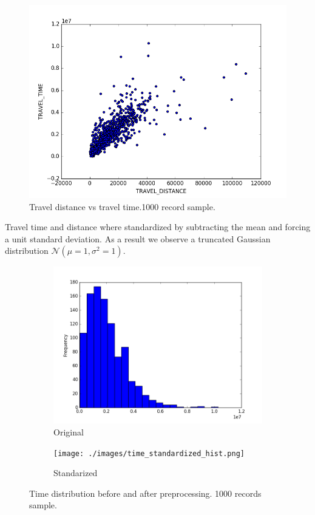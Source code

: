\documentclass{article}
\begin{document}
\begin{figure}[H]
  \centering
  \includegraphics[width=.8\linewidth]{./images/distance_vs_time.png}
  \caption{Travel distance vs travel time.1000 record sample.}
  \label{fig:preprocessing/distance_time_correlation}
\end{figure}

Travel time and distance where standardized by subtracting the mean and forcing a unit standard deviation. As a result we observe a truncated Gaussian distribution $\mathcal{N}(\mu = 1, \sigma^2 = 1)$.

\begin{figure}[H]
  \centering
  \begin{subfigure}[b]{.45\textwidth}
  	\centering
  	\includegraphics[width=\linewidth]{./images/time_hist.png}
  	\caption{Original}
  \end{subfigure}
  \begin{subfigure}[b]{.45\textwidth}
  	\centering
  	\texttt{[image: ./images/time\_standardized\_hist.png]}
  	\caption{Standarized}
  \end{subfigure}
  \caption{Time distribution before and after preprocessing. 1000 records sample.}
  	\label{fig:preprocessing/time}
\end{figure}
\end{document}
